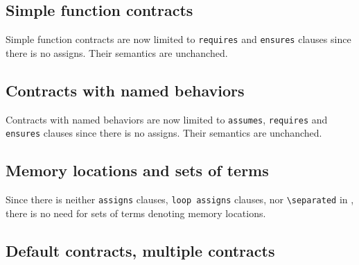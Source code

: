 \nodiff


\subsection{Simple function contracts}
\label{sec:simplecontracts}


Simple function contracts are now limited to \lstinline|requires| and
\lstinline|ensures| clauses since there is no assigns. Their semantics are
unchanched.


\subsection{Contracts with named behaviors}
\label{subsec:behaviors}


Contracts with named behaviors are now limited to \lstinline|assumes|,
\lstinline|requires| and \lstinline|ensures| clauses since there is no
assigns. Their semantics are unchanched.


\subsection{Memory locations and sets of terms}
\label{sec:locations}

\absent

Since there is neither \lstinline|assigns| clauses, \lstinline|loop assigns|
clauses, nor \lstinline|\separated| in \eacsl, there is no need for sets of
terms denoting memory locations.


\subsection{Default contracts, multiple contracts}
\label{sec:multiplecontracts}

\nodiff


